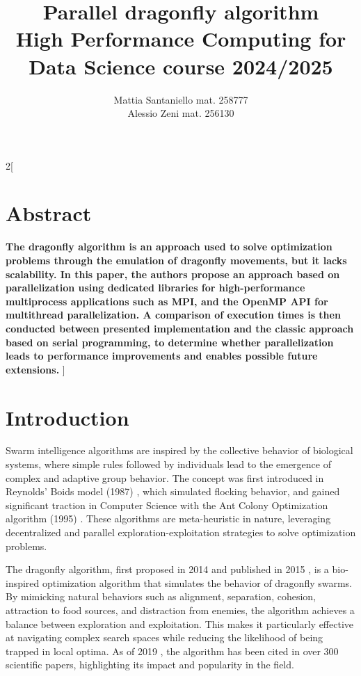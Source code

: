 \documentclass[10pt]{article}
\title{\textbf{Parallel dragonfly algorithm} %
  \\[2ex] \large High Performance Computing for Data Science course 2024/2025
}
\author{
  Mattia Santaniello \quad  mat. 258777 \\ Alessio Zeni  \quad
  mat. 256130  
}
\begin{document}
\maketitle

\begin{multicols}{2}[
  \fontsize{9}{9}
  \section*{Abstract}
  \textbf{
    The dragonfly algorithm is an approach used to solve optimization problems through the emulation of dragonfly movements, but it lacks scalability.
  In this paper, the authors propose an approach based on parallelization using dedicated libraries for high-performance multiprocess applications such as MPI, and the OpenMP API for multithread parallelization.
  A comparison of execution times is then conducted between presented implementation and the classic approach based on serial programming,
  to determine whether parallelization leads to performance improvements and enables possible future extensions.
  }\newline]

\section{Introduction}
Swarm intelligence algorithms are inspired by the collective behavior of biological systems, where simple rules followed by individuals lead to the emergence of complex and adaptive group behavior.
The concept was first introduced in Reynolds' Boids model (1987) \cite{Boids}, which simulated flocking behavior, and gained significant traction in Computer Science with the Ant Colony Optimization algorithm (1995) \cite{Ant_Colony_optimization}.
These algorithms are meta-heuristic in nature, leveraging decentralized and parallel exploration-exploitation strategies to solve optimization problems.

The dragonfly algorithm, first proposed in 2014 and published in 2015 \cite{Original}, is a bio-inspired optimization algorithm that simulates the behavior of dragonfly swarms.
By mimicking natural behaviors such as alignment, separation, cohesion, attraction to food sources, and distraction from enemies, the algorithm achieves a balance between exploration and exploitation.
This makes it particularly effective at navigating complex search spaces while reducing the likelihood of being trapped in local optima.
As of 2019 \cite{Meraihi2020}, the algorithm has been cited in over 300 scientific papers, highlighting its impact and popularity in the field.


\end{multicols}
\end{document}

